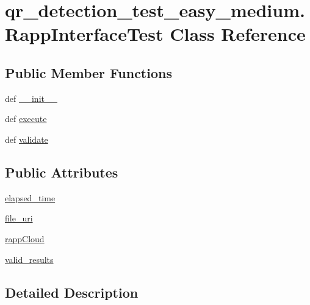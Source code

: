 \hypertarget{classqr__detection__test__easy__medium_1_1RappInterfaceTest}{\section{qr\-\_\-detection\-\_\-test\-\_\-easy\-\_\-medium.\-Rapp\-Interface\-Test Class Reference}
\label{classqr__detection__test__easy__medium_1_1RappInterfaceTest}
}
\subsection*{Public Member Functions}
\begin{DoxyCompactItemize}
\item 
def \hyperlink{classqr__detection__test__easy__medium_1_1RappInterfaceTest_aa71eda97f8ec5b006a7abe454f09ebec}{\-\_\-\-\_\-init\-\_\-\-\_\-}
\item 
def \hyperlink{classqr__detection__test__easy__medium_1_1RappInterfaceTest_aac3034fb8d93ede7f54ae9f7d01c438a}{execute}
\item 
def \hyperlink{classqr__detection__test__easy__medium_1_1RappInterfaceTest_abea1d8bae842b3ce3574af18d8c4b4b8}{validate}
\end{DoxyCompactItemize}
\subsection*{Public Attributes}
\begin{DoxyCompactItemize}
\item 
\hyperlink{classqr__detection__test__easy__medium_1_1RappInterfaceTest_a4ac4450b97de36b77ac3efec90f8543e}{elapsed\-\_\-time}
\item 
\hyperlink{classqr__detection__test__easy__medium_1_1RappInterfaceTest_a5ec8c97e597ac3c713a8fc3fcf1a7f20}{file\-\_\-uri}
\item 
\hyperlink{classqr__detection__test__easy__medium_1_1RappInterfaceTest_a981c74d47f103e50870de521755268a8}{rapp\-Cloud}
\item 
\hyperlink{classqr__detection__test__easy__medium_1_1RappInterfaceTest_a713cf42e02e18a8ffedc6be5bd82affb}{valid\-\_\-results}
\end{DoxyCompactItemize}


\subsection{Detailed Description}


